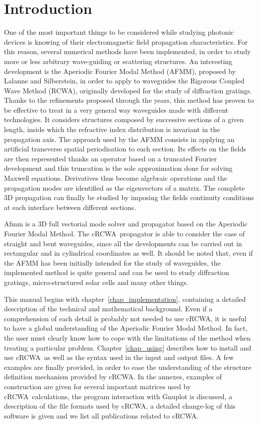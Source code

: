 \documentclass[10pt, a4paper]{book}
\newcommand{\afmm}{\textsf{cRCWA}}
\begin{document}
\chapter*{Introduction}
\textsf{
One of the most important things to be considered while studying photonic devices is knowing of their electromagnetic field propagation characteristics. For this reason, several numerical methods have been implemented, in order to study more or less arbitrary wave-guiding or scattering structures. An interesting development is the Aperiodic Fourier Modal Method (AFMM), proposed by Lalanne and Silberstein\cite{lalanne2000fmm,silberstein2001ugt}, in order to apply to waveguides the Rigorous Coupled Wave Method (RCWA), originally developed for the study of diffraction gratings\cite{moharam1981rigorous, li2000recent}. Thanks to the refinements proposed through the years, this method has proven to be effective to treat in a very general way waveguides made with different technologies. It considers structures composed by successive sections of a given length, inside which the refractive index distribution is invariant in the propagation axis. The approach used by the AFMM consists in applying an artificial transverse spatial periodisation to each section. Its effects on the fields are then represented thanks an operator based on a truncated Fourier development and this truncation is the sole approximation done for solving Maxwell equations. Derivatives thus become algebraic operations and the propagation modes are identified as the eigenvectors of a matrix. The complete 3D propagation can finally be studied by imposing the fields continuity conditions at each interface between different sections.}

\textsf{
Afmm is a 3D full vectorial mode solver and propagator based on the Aperiodic Fourier Modal Method. 
The \afmm\ propagator is able to consider the case of straight and bent waveguides, since all the developments can be carried out in rectangular and in cylindrical coordinates as well. It should be noted that, even if the AFMM has  been initially intended for the study of waveguides, the implemented method is quite general and can be used to study diffraction gratings, micro-structured solar cells \cite{el2009photonic} and many other things. 
}

\textsf{
This manual begins with chapter~\ref{chap_implementation}, containing a detailed description of the technical and mathematical background. Even if a comprehension of each detail is probably not needed to use \afmm, it is useful to have a global understanding of the Aperiodic Fourier Modal Method. In fact, the user must clearly know how to cope with the limitations of the method when treating a particular problem.
Chapter~\ref{chap_using} describes how to install and use \afmm\, as well as the  syntax used in the input and output files. A few examples are finally provided, in order to ease the understanding of the structure definition mechanism provided by \afmm.
In the annexes, examples of construction are given for several important matrices used by \afmm\ calculations, the program interaction with Gnuplot is discussed, a description of the file formats used by \afmm , a detailed change-log of this software is given and we list all publications related to \afmm .
}
\end{document}
